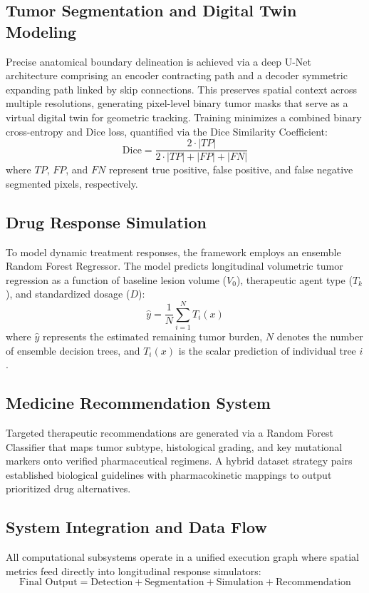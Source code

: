 \documentclass[conference]{IEEEtran}
\begin{document}
\subsection{Tumor Segmentation and Digital Twin Modeling}
Precise anatomical boundary delineation is achieved via a deep U-Net architecture comprising an encoder contracting path and a decoder symmetric expanding path linked by skip connections. This preserves spatial context across multiple resolutions, generating pixel-level binary tumor masks that serve as a virtual digital twin for geometric tracking. Training minimizes a combined binary cross-entropy and Dice loss, quantified via the Dice Similarity Coefficient:
\begin{equation}
\text{Dice} = \frac{2 \cdot |TP|}{2 \cdot |TP| + |FP| + |FN|}
\label{eq:dice}
\end{equation}
where $TP$, $FP$, and $FN$ represent true positive, false positive, and false negative segmented pixels, respectively.

\subsection{Drug Response Simulation}
To model dynamic treatment responses, the framework employs an ensemble Random Forest Regressor. The model predicts longitudinal volumetric tumor regression as a function of baseline lesion volume ($V_0$), therapeutic agent type ($T_k$), and standardized dosage ($D$):
\begin{equation}
\hat{y} = \frac{1}{N} \sum_{i=1}^N T_i(x)
\label{eq:rf_reg}
\end{equation}
where $\hat{y}$ represents the estimated remaining tumor burden, $N$ denotes the number of ensemble decision trees, and $T_i(x)$ is the scalar prediction of individual tree $i$.

\subsection{Medicine Recommendation System}
Targeted therapeutic recommendations are generated via a Random Forest Classifier that maps tumor subtype, histological grading, and key mutational markers onto verified pharmaceutical regimens. A hybrid dataset strategy pairs established biological guidelines with pharmacokinetic mappings to output prioritized drug alternatives.

\subsection{System Integration and Data Flow}
All computational subsystems operate in a unified execution graph where spatial metrics feed directly into longitudinal response simulators:
\begin{equation}
\text{Final Output} = \text{Detection} + \text{Segmentation} + \text{Simulation} + \text{Recommendation}
\label{eq:pipeline}
\end{equation}
\end{document}
